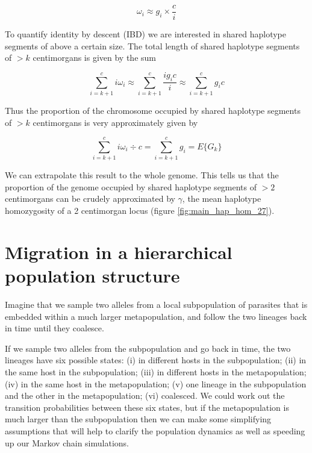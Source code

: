 \documentclass[_main.tex]{subfiles}
\begin{document}
\begin{equation*}
\omega_i \approx g_i \times \frac{c}{i}
\end{equation*}

To quantify identity by descent (IBD) we are interested in shared haplotype segments of above a certain size.  The total length of shared haplotype segments of $>k$ centimorgans is given by the sum

\begin{equation*}
\sum_{i = k + 1}^c i \omega_i \approx \sum_{i = k +1 }^c \frac{i g_i c}{i} \approx \sum_{i = k +1 }^c g_i c
\end{equation*}

Thus the proportion of the chromosome occupied by shared haplotype segments of $>k$ centimorgans is very approximately given by

\begin{equation}
\sum_{i = k + 1}^c i \omega_i \div c
= \sum_{i = k +1 }^c g_i 
= E \{G_k \}
\end{equation}

We can extrapolate this result to the whole genome.   This tells us that the proportion of the genome occupied by shared haplotype segments of $>2$ centimorgans can be crudely approximated by $\gamma$, the mean haplotype homozygosity of a 2 centimorgan locus (figure \ref{fig:main_hap_hom_27}).   


\section{Migration in a hierarchical population structure}

\label{supp_migration_1}

Imagine that we sample two alleles from a local subpopulation of parasites that is embedded within a much larger metapopulation, and follow the two lineages back in time until they coalesce.  

If we sample two alleles from the subpopulation and go back in time, the two lineages have six possible states: (i) in different hosts in the subpopulation; (ii) in the same host in the subpopulation; (iii) in different hosts in the metapopulation; (iv) in the same host in the metapopulation; (v) one lineage in the subpopulation and the other in the metapopulation; (vi) coalesced.  We could work out the transition probabilities between these six states, but if the metapopulation is much larger than the subpopulation then we can make some simplifying assumptions that will help to clarify the population dynamics as well as speeding up our Markov chain simulations.
\end{document}

